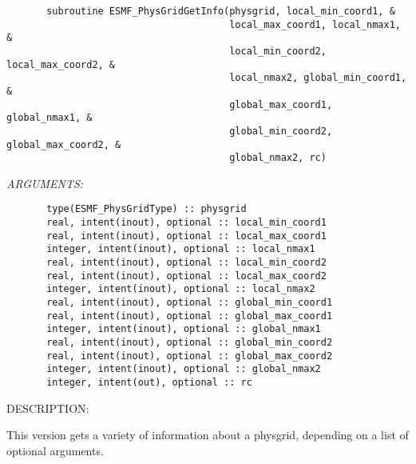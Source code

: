  
\begin{verbatim}       subroutine ESMF_PhysGridGetInfo(physgrid, local_min_coord1, &
                                       local_max_coord1, local_nmax1, &
                                       local_min_coord2, local_max_coord2, &
                                       local_nmax2, global_min_coord1, &
                                       global_max_coord1, global_nmax1, &
                                       global_min_coord2, global_max_coord2, &
                                       global_nmax2, rc)\end{verbatim}{\em ARGUMENTS:}
\begin{verbatim}       type(ESMF_PhysGridType) :: physgrid
       real, intent(inout), optional :: local_min_coord1
       real, intent(inout), optional :: local_max_coord1
       integer, intent(inout), optional :: local_nmax1
       real, intent(inout), optional :: local_min_coord2
       real, intent(inout), optional :: local_max_coord2
       integer, intent(inout), optional :: local_nmax2
       real, intent(inout), optional :: global_min_coord1
       real, intent(inout), optional :: global_max_coord1
       integer, intent(inout), optional :: global_nmax1
       real, intent(inout), optional :: global_min_coord2
       real, intent(inout), optional :: global_max_coord2
       integer, intent(inout), optional :: global_nmax2
       integer, intent(out), optional :: rc              \end{verbatim}
{\sf DESCRIPTION:\\ }


       This version gets a variety of information about a physgrid, depending
       on a list of optional arguments.
  
